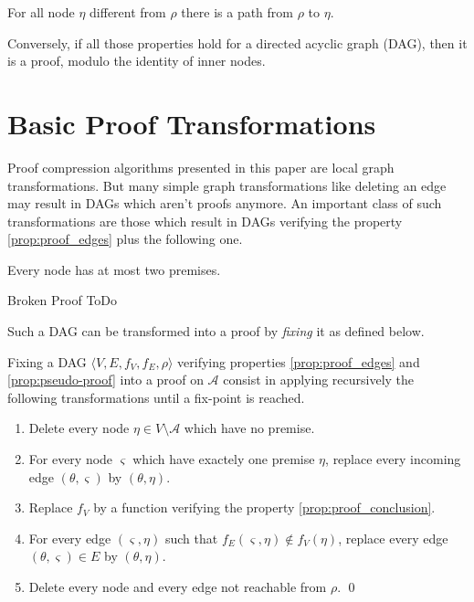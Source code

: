 \documentclass{llncs}
\begin{document}
\begin{property}
For all node $\eta$ different from $\rho$ there is a path from $\rho$ to $\eta$.
\end{property}

Conversely, if all those properties hold for a directed acyclic graph (DAG), then it is a proof,
modulo the identity of inner nodes.

\section{Basic Proof Transformations}


Proof compression algorithms presented in this paper are local graph transformations.  But many
simple graph transformations like deleting an edge may result in DAGs which aren't proofs anymore.
An important class of such transformations are those which result in DAGs verifying the property
\ref{prop:proof_edges} plus the following one.

\begin{property}
\label{prop:pseudo-proof}
Every node has at most two premises.
\end{property}

\begin{definition}{Broken Proof}
ToDo

\end{definition}


Such a DAG can be transformed into a proof by \emph{fixing} it as defined below.

\begin{definition}[Fixing]
Fixing a DAG $\langle V, E, f_V, f_E, \rho \rangle$ verifying properties \ref{prop:proof_edges} and
\ref{prop:pseudo-proof} into a proof on $\mathcal{A}$ consist in applying recursively the following
transformations until a fix-point is reached.
\begin{enumerate}
  \item Delete every node $\eta \in V \setminus \mathcal{A}$ which have no premise.
  \item For every node $\varsigma$ which have exactely one premise $\eta$, replace every incoming
    edge $(\theta,\varsigma)$ by $(\theta,\eta)$.
  \item Replace $f_V$ by a function verifying the property \ref{prop:proof_conclusion}.
  \item For every edge $(\varsigma,\eta)$ such that $f_E(\varsigma,\eta) \notin f_V(\eta)$, replace
    every edge $(\theta,\varsigma) \in E$ by $(\theta,\eta)$.
  \item Delete every node and every edge not reachable from $\rho$.
  \qed
\end{enumerate}
\end{definition}
\end{document}
